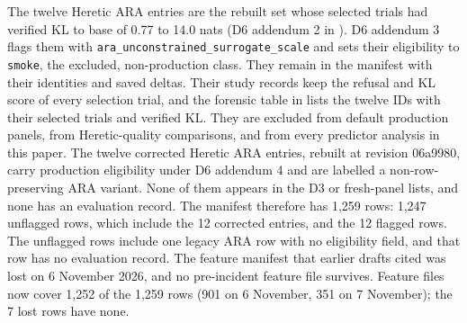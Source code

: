 The twelve Heretic ARA entries are the rebuilt set whose selected trials had verified KL to base of 0.77 to 14.0 nats (D6 addendum 2 in ). D6 addendum 3 flags them with \texttt{ara\_unconstrained\_surrogate\_scale} and sets their eligibility to \texttt{smoke}, the excluded, non-production class. They remain in the manifest with their identities and saved deltas. Their study records keep the refusal and KL score of every selection trial, and the forensic table in  lists the twelve IDs with their selected trials and verified KL. They are excluded from default production panels, from Heretic-quality comparisons, and from every predictor analysis in this paper. The twelve corrected Heretic ARA entries, rebuilt at revision 06a9980, carry production eligibility under D6 addendum 4 and are labelled a non-row-preserving ARA variant. None of them appears in the D3 or fresh-panel lists, and none has an evaluation record. The manifest therefore has 1,259 rows: 1,247 unflagged rows, which include the 12 corrected entries, and the 12 flagged rows. The unflagged rows include one legacy ARA row with no eligibility field, and that row has no evaluation record. %
The feature manifest that earlier drafts cited was lost on 6 November 2026, and no pre-incident feature file survives. Feature files now cover 1,252 of the 1,259 rows (901 on 6 November, 351 on 7 November); the 7 lost rows have none.
